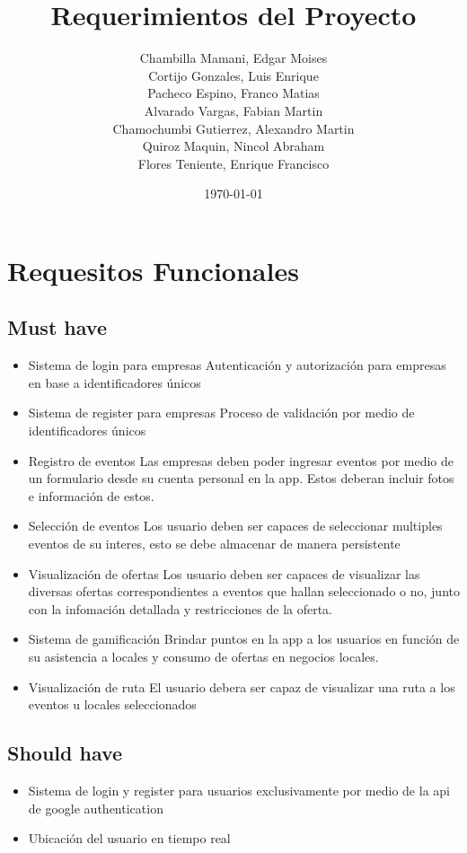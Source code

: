 \documentclass[a4paper,12pt,oneside]{article}
\author{
  \begin{tabular}{cc}
      \\
  Chambilla Mamani, Edgar Moises \\
  Cortijo Gonzales, Luis Enrique \\
  Pacheco Espino, Franco Matias \\
  Alvarado Vargas, Fabian Martin \\
  Chamochumbi Gutierrez, Alexandro Martin \\
  Quiroz Maquin, Nincol Abraham \\
  Flores Teniente, Enrique Francisco \\
  \end{tabular}
}
\title{Requerimientos del Proyecto}
\date{\today}
\begin{document}


\tableofcontents
\newpage


\section{Requesitos Funcionales}

\subsection{Must have}
  \begin{itemize}
    \item Sistema de login para empresas
      Autenticación y autorización para empresas en base a identificadores únicos
    \item Sistema de register para empresas
      Proceso de validación por medio de identificadores únicos
    \item Registro de eventos
      Las empresas deben poder ingresar eventos por medio de un formulario desde su cuenta personal en la app. Estos deberan incluir fotos e información de estos.
    \item Selección de eventos
      Los usuario deben ser capaces de seleccionar multiples eventos de su interes, esto se debe almacenar de manera persistente
    \item Visualización de ofertas
      Los usuario deben ser capaces de visualizar las diversas ofertas correspondientes a eventos que hallan seleccionado o no, junto con la infomación detallada y restricciones de la oferta.
    \item Sistema de gamificación
      Brindar puntos en la app a los usuarios en función de su asistencia a locales y consumo de ofertas en negocios locales.
    \item Visualización de ruta
      El usuario debera ser capaz de visualizar una ruta a los eventos u locales seleccionados

  \end{itemize}

\subsection{Should have}
  \begin{itemize}
    \item Sistema de login y register para usuarios
      exclusivamente por medio de la api de google authentication
    \item Ubicación del usuario en tiempo real
  \end{itemize}
\end{document}
